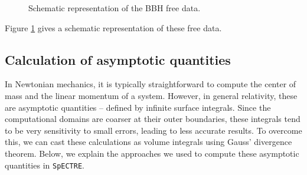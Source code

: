 \documentclass{../document}
\begin{document}
      \begin{figure}
        \centering
        \caption{Schematic representation of the BBH free data.}
        \label{fig:free-data}
      \end{figure}

      Figure \ref{fig:free-data} gives a schematic representation of these free data.

    \subsection{Calculation of asymptotic quantities}

      In Newtonian mechanics, it is typically straightforward to compute the center of mass and the linear momentum of a system. However, in general relativity, these are asymptotic quantities -- defined by infinite surface integrals. Since the computational domains are coarser at their outer boundaries, these integrals tend to be very sensitivity to small errors, leading to less accurate results. To overcome this, we can cast these calculations as volume integrals using Gauss' divergence theorem. Below, we explain the approaches we used to compute these asymptotic quantities in {\tt SpECTRE}.
\end{document}
